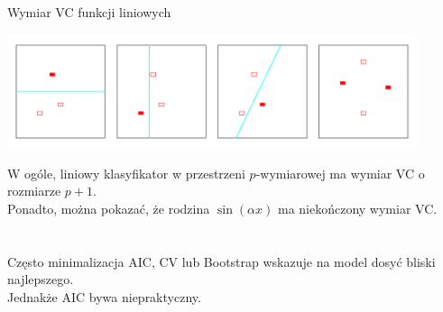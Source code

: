 \documentclass[a4paper]{beamer}
\begin{document}
\begin{frame}
\begin{block}{}
Wymiar VC funkcji liniowych
\end{block}
\begin{center}
\includegraphics[width=12cm]{fig7-6.png}
\end{center}
\begin{block}{}
W ogóle, liniowy klasyfikator w przestrzeni $p$-wymiarowej ma wymiar VC o rozmiarze $p+1$. \\
Ponadto, można pokazać, że rodzina $\sin(\alpha x)$ ma niekończony wymiar VC. 
\end{block}
\end{frame}

\section{}
\begin{frame}
\begin{block}{}
Często minimalizacja AIC, CV lub Bootstrap wskazuje na model dosyć bliski najlepszego. \\
Jednakże AIC bywa niepraktyczny.
\end{block}
\end{frame}
\end{document}
